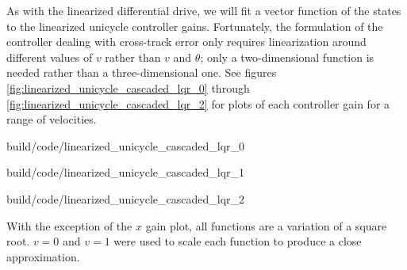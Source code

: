 As with the linearized differential drive, we will fit a vector function of the
states to the linearized unicycle controller gains. Fortunately, the formulation
of the controller dealing with cross-track error only requires linearization
around different values of $v$ rather than $v$ and $\theta$; only a
two-dimensional function is needed rather than a three-dimensional one. See
figures \ref{fig:linearized_unicycle_cascaded_lqr_0} through
\ref{fig:linearized_unicycle_cascaded_lqr_2} for plots of each controller gain
for a range of velocities.

\begin{bookfigure}
  \begin{minisvg}{build/code/linearized_unicycle_cascaded_lqr_0}
    \caption{Linearized unicycle controller cascaded LQR gain regression ($x$)}
    \label{fig:linearized_unicycle_cascaded_lqr_0}
  \end{minisvg}
  \hfill
  \begin{minisvg}{build/code/linearized_unicycle_cascaded_lqr_1}
    \caption{Linearized unicycle controller cascaded LQR gain regression ($y$)}
    \label{fig:linearized_unicycle_cascaded_lqr_1}
  \end{minisvg}
  \hfill
  \begin{minisvg}{build/code/linearized_unicycle_cascaded_lqr_2}
    \caption{Linearized unicycle controller cascaded LQR gain regression
      ($\theta$)}
    \label{fig:linearized_unicycle_cascaded_lqr_2}
  \end{minisvg}
\end{bookfigure}

With the exception of the $x$ gain plot, all functions are a variation of a
square root. $v = 0$ and $v = 1$ were used to scale each function to produce a
close approximation.

